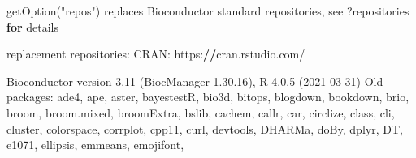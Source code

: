 \documentclass[
]{book}
\newenvironment{Shaded}{\begin{snugshade}}{\end{snugshade}}
\newcommand{\ControlFlowTok}[1]{\textcolor[rgb]{0.13,0.29,0.53}{\textbf{#1}}}
\newcommand{\DecValTok}[1]{\textcolor[rgb]{0.00,0.00,0.81}{#1}}
\newcommand{\ErrorTok}[1]{\textcolor[rgb]{0.64,0.00,0.00}{\textbf{#1}}}
\newcommand{\FloatTok}[1]{\textcolor[rgb]{0.00,0.00,0.81}{#1}}
\newcommand{\NormalTok}[1]{#1}
\newcommand{\SpecialCharTok}[1]{\textcolor[rgb]{0.00,0.00,0.00}{#1}}
\newcommand{\StringTok}[1]{\textcolor[rgb]{0.31,0.60,0.02}{#1}}
\begin{document}
\begin{Shaded}
\begin{Highlighting}[]
\StringTok{\textquotesingle{}getOption("repos")\textquotesingle{}}\NormalTok{ replaces Bioconductor standard repositories, see }\StringTok{\textquotesingle{}?repositories\textquotesingle{}} \ControlFlowTok{for}
\NormalTok{details}

\NormalTok{replacement repositories}\SpecialCharTok{:}
\NormalTok{    CRAN}\SpecialCharTok{:}\NormalTok{ https}\SpecialCharTok{:}\ErrorTok{//}\NormalTok{cran.rstudio.com}\SpecialCharTok{/}

\NormalTok{Bioconductor version }\FloatTok{3.11}\NormalTok{ (BiocManager }\DecValTok{1}\NormalTok{.}\FloatTok{30.16}\NormalTok{), R }\DecValTok{4}\NormalTok{.}\FloatTok{0.5}\NormalTok{ (}\DecValTok{2021{-}03{-}31}\NormalTok{)}
\NormalTok{Old packages}\SpecialCharTok{:} \StringTok{\textquotesingle{}ade4\textquotesingle{}}\NormalTok{, }\StringTok{\textquotesingle{}ape\textquotesingle{}}\NormalTok{, }\StringTok{\textquotesingle{}aster\textquotesingle{}}\NormalTok{, }\StringTok{\textquotesingle{}bayestestR\textquotesingle{}}\NormalTok{, }\StringTok{\textquotesingle{}bio3d\textquotesingle{}}\NormalTok{, }\StringTok{\textquotesingle{}bitops\textquotesingle{}}\NormalTok{, }\StringTok{\textquotesingle{}blogdown\textquotesingle{}}\NormalTok{,}
  \StringTok{\textquotesingle{}bookdown\textquotesingle{}}\NormalTok{, }\StringTok{\textquotesingle{}brio\textquotesingle{}}\NormalTok{, }\StringTok{\textquotesingle{}broom\textquotesingle{}}\NormalTok{, }\StringTok{\textquotesingle{}broom.mixed\textquotesingle{}}\NormalTok{, }\StringTok{\textquotesingle{}broomExtra\textquotesingle{}}\NormalTok{, }\StringTok{\textquotesingle{}bslib\textquotesingle{}}\NormalTok{, }\StringTok{\textquotesingle{}cachem\textquotesingle{}}\NormalTok{, }\StringTok{\textquotesingle{}callr\textquotesingle{}}\NormalTok{,}
  \StringTok{\textquotesingle{}car\textquotesingle{}}\NormalTok{, }\StringTok{\textquotesingle{}circlize\textquotesingle{}}\NormalTok{, }\StringTok{\textquotesingle{}class\textquotesingle{}}\NormalTok{, }\StringTok{\textquotesingle{}cli\textquotesingle{}}\NormalTok{, }\StringTok{\textquotesingle{}cluster\textquotesingle{}}\NormalTok{, }\StringTok{\textquotesingle{}colorspace\textquotesingle{}}\NormalTok{, }\StringTok{\textquotesingle{}corrplot\textquotesingle{}}\NormalTok{, }\StringTok{\textquotesingle{}cpp11\textquotesingle{}}\NormalTok{, }\StringTok{\textquotesingle{}curl\textquotesingle{}}\NormalTok{,}
  \StringTok{\textquotesingle{}devtools\textquotesingle{}}\NormalTok{, }\StringTok{\textquotesingle{}DHARMa\textquotesingle{}}\NormalTok{, }\StringTok{\textquotesingle{}doBy\textquotesingle{}}\NormalTok{, }\StringTok{\textquotesingle{}dplyr\textquotesingle{}}\NormalTok{, }\StringTok{\textquotesingle{}DT\textquotesingle{}}\NormalTok{, }\StringTok{\textquotesingle{}e1071\textquotesingle{}}\NormalTok{, }\StringTok{\textquotesingle{}ellipsis\textquotesingle{}}\NormalTok{, }\StringTok{\textquotesingle{}emmeans\textquotesingle{}}\NormalTok{, }\StringTok{\textquotesingle{}emojifont\textquotesingle{}}\NormalTok{,}

\end{Highlighting}
\end{Shaded}
\end{document}
